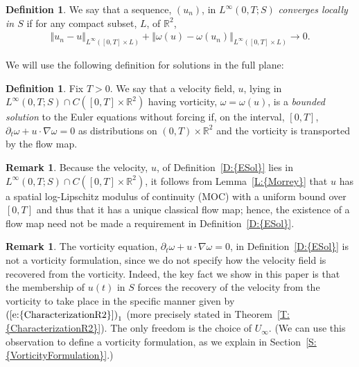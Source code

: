 \documentclass[reqno,openright,11pt,twoside]{amsart}
\theoremstyle{definition}
\newtheorem{definition}[theorem]{Definition}
\newtheorem{remark}[theorem]{Remark}
\numberwithin{equation}{section}
\begin{document}
\begin{definition}\label{D:SerfatiConvergence}	
	We say that a sequence, $(u_n)$, in $L^{\ensuremath{\infty}}(0, T; S)$
	\textit{converges locally in $S$} if for any compact subset,
	$L$, of ${\ensuremath{{\ensuremath{\mathbb{{R}}}}}}^2$,
	\begin{align*}
	    {\ensuremath{\left\Vert {u_n - u} \right\Vert}}_{L^{\ensuremath{\infty}}([0, T] \times L)}
	        + {\ensuremath{\left\Vert {\omega(u) - \omega(u_n)} \right\Vert}}_{L^{\ensuremath{\infty}}([0, T] \times L)}
	        \to 0. 
    \end{align*}	
\end{definition}

We will use the following definition for solutions in the full plane:

\begin{definition}\label{D:ESol}
	Fix $T > 0$. 
	We say that a velocity field, $u$, lying in $L^{\ensuremath{\infty}}(0, T; S) \cap
	C([0, T] \times {\ensuremath{{\ensuremath{\mathbb{{R}}}}}}^2)$
	having vorticity, $\omega = \omega(u)$,
	is a \textit{bounded solution} to the Euler equations
	without forcing if, on the interval, $[0, T]$,
	$
		{\ensuremath{\partial}}_t \omega + u \cdot {\ensuremath{\nabla}} \omega
			= 0
	$
	as distributions on $(0, T) \times {\ensuremath{{\ensuremath{\mathbb{{R}}}}}}^2$ and the vorticity is
	transported by the flow map. 
	
\end{definition}

\begin{remark}\label{R:FlowMap}
Because the velocity, $u$, of {Definition~\ref{D:{ESol}}} lies in $L^{\ensuremath{\infty}}(0, T; S) \cap C([0, T] \times {\ensuremath{{\ensuremath{\mathbb{{R}}}}}}^2)$, it follows from {Lemma~\ref{L:{Morrey}}} that $u$ has a spatial log-Lipschitz modulus of continuity (MOC) with a uniform bound over $[0, T]$ and thus that it has a unique classical flow map; hence, the existence of a flow map need not be made a requirement in {Definition~\ref{D:{ESol}}}.
\end{remark}

\begin{remark}\label{R:CharacterizingSolutions}
The vorticity equation, ${\ensuremath{\partial}}_t \omega + u \cdot {\ensuremath{\nabla}} \omega = 0$, in {Definition~\ref{D:{ESol}}} is not a vorticity formulation, since we do not specify how the velocity field is recovered from the vorticity. Indeed, the key fact we show in this paper is that the membership of $u(t)$ in $S$ forces the recovery of the velocity from the vorticity to take place in the specific manner given by ${(\ref{e:{CharacterizationR2}})}_1$  (more precisely stated in {Theorem~\ref{T:{CharacterizationR2}}}). The only freedom is the choice of $U_{\ensuremath{\infty}}$. (We can use this observation to define a vorticity formulation, as we explain in {Section~\ref{S:{VorticityFormulation}}}.)
\end{remark}
\end{document}
